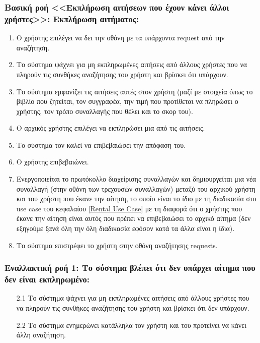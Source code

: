 \documentclass[12pt,a4paper]{article}
\begin{document}
\subsubsection*{Βασική ροή <<Εκπλήρωση αιτήσεων που έχουν κάνει άλλοι χρήστες>>: Εκπλήρωση αιτήματος:}
\begin{enumerate}
    \item Ο χρήστης επιλέγει να δει την οθόνη με τα υπάρχοντα request από την αναζήτηση.
    \item Το σύστημα ψάχνει για μη εκπληρωμένες αιτήσεις από άλλους χρήστες που να πληρούν τις συνθήκες αναζήτησης του χρήστη και βρίσκει ότι υπάρχουν.
    \item Το σύστημα εμφανίζει τις αιτήσεις αυτές στον χρήστη (μαζί με στοιχεία όπως το βιβλίο που ζητείται, τον συγγραφέα, την τιμή που προτίθεται να πληρώσει ο χρήστης, τον τρόπο συναλλαγής που θέλει και το σκορ του). 
    \item Ο αρχικός χρήστης επιλέγει να εκπληρώσει μια από τις αιτήσεις.
    \item Το σύστημα τον καλεί να επιβεβαιώσει την απόφαση του.
    \item Ο χρήστης επιβεβαιώνει.
    \item Ενεργοποιείται το πρωτόκολλο διαχείρισης συναλλαγών και δημιουργείται μια νέα συναλλαγή (στην οθόνη των τρεχουσών συναλλαγών) μεταξύ του αρχικού χρήστη και του χρήστη που έκανε την αίτηση, το οποίο είναι το ίδιο με τη διαδικασία στο use case του κεφαλαίου \ref{Rental Use Case} με τη διαφορά ότι ο χρήστης που έκανε την αίτηση είναι αυτός που πρέπει να επιβεβαιώσει το αρχικό αίτημα (δεν εξηγούμε ξανά όλη την όλη διαδικασία εφόσον κατά τα άλλα είναι η ίδια).
    \item Το σύστημα επιστρέφει το χρήστη στην οθόνη αναζήτησης requests.
\end{enumerate}

\subsubsection*{Εναλλακτική ροή 1: Το σύστημα βλέπει ότι δεν υπάρχει αίτημα που δεν είναι εκπληρωμένο:}
\begin{enumerate}
    \item [2.1] Το σύστημα ψάχνει για μη εκπληρωμένες αιτήσεις από άλλους χρήστες που να πληρούν τις συνθήκες αναζήτησης του χρήστη και βρίσκει ότι δεν υπάρχουν.
    \item [2.2] Το σύστημα ενημερώνει κατάλληλα τον χρήστη και του προτείνει να κάνει άλλη αναζήτηση.
\end{enumerate}
\end{document}
